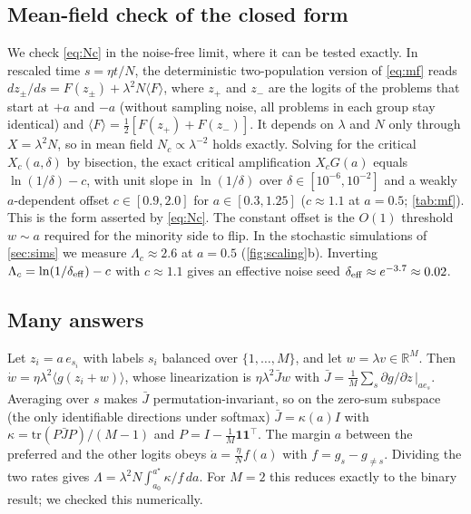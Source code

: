 \subsection{Mean-field check of the closed form}
\label{app:mfcheck}
We check \cref{eq:Nc} in the noise-free limit, where it can be tested exactly.
In rescaled time $s=\eta t/N$, the deterministic two-population version of \cref{eq:mf} reads $dz_\pm/ds=F(z_\pm)+\lambda^2N\langle F\rangle$, where $z_+$ and $z_-$ are the logits of the problems that start at $+a$ and $-a$ (without sampling noise, all problems in each group stay identical) and $\langle F\rangle=\tfrac12[F(z_+)+F(z_-)]$. It depends on $\lambda$ and $N$ only through $X=\lambda^2N$, so in mean field $N_c\propto\lambda^{-2}$ holds exactly.
Solving for the critical $X_c(a,\delta)$ by bisection, the exact critical amplification $X_cG(a)$ equals $\ln(1/\delta)-c$, with unit slope in $\ln(1/\delta)$ over $\delta\in[10^{-6},10^{-2}]$ and a weakly $a$-dependent offset $c\in[0.9,2.0]$ for $a\in[0.3,1.25]$ ($c\approx1.1$ at $a=0.5$; \cref{tab:mf}). This is the form asserted by \cref{eq:Nc}.
The constant offset is the $O(1)$ threshold $w\sim a$ required for the minority side to flip.
In the stochastic simulations of \cref{sec:sims} we measure $\Lambda_c\approx2.6$ at $a=0.5$ (\cref{fig:scaling}b). Inverting $\Lambda_c=\ln(1/\delta_{\rm eff})-c$ with $c\approx1.1$ gives an effective noise seed $\delta_{\rm eff}\approx e^{-3.7}\approx0.02$.



\subsection{Many answers}
\label{app:multi}
Let $z_i=a\,e_{s_i}$ with labels $s_i$ balanced over $\{1,\dots,M\}$, and let $w=\lambda v\in\mathbb R^M$.
Then $\dot w=\eta\lambda^2\langle g(z_i+w)\rangle$, whose linearization is $\eta\lambda^2\bar J w$ with $\bar J=\frac1M\sum_s\partial g/\partial z\,|_{ae_s}$.
Averaging over $s$ makes $\bar J$ permutation-invariant, so on the zero-sum subspace (the only identifiable directions under softmax) $\bar J=\kappa(a)I$ with $\kappa=\mathrm{tr}(P\bar JP)/(M-1)$ and $P=I-\frac1M\mathbf1\mathbf1^\top$.
The margin $a$ between the preferred and the other logits obeys $\dot a=\frac\eta N f(a)$ with $f=g_{s}-g_{\neq s}$.
Dividing the two rates gives $\Lambda=\lambda^2N\int_{a_0}^{a^\star}\kappa/f\,da$.
For $M=2$ this reduces exactly to the binary result; we checked this numerically.

